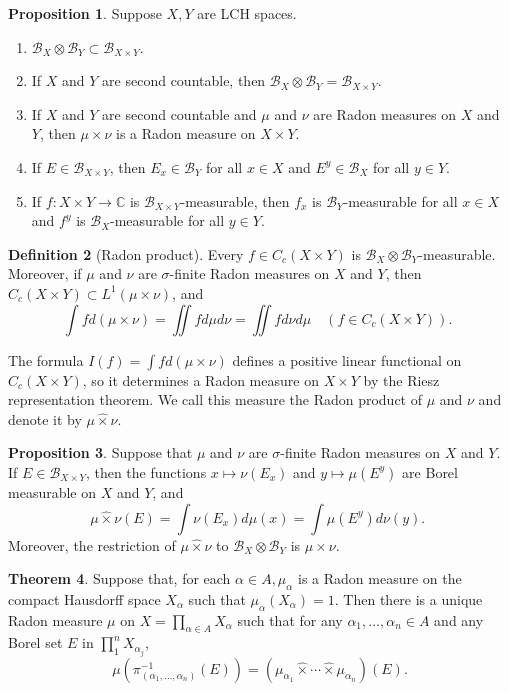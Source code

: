 \documentclass[12pt,a4paper]{book}
\newenvironment{enu}{\begin{enumerate}[(1)]}{\end{enumerate}}
\theoremstyle{definition}
\newtheorem{defn}{Definition}[section]
\newtheorem{theo}[defn]{Theorem}
\newtheorem{prop}[defn]{Proposition}
\begin{document}
\begin{prop}
    Suppose $X,Y$ are LCH spaces.
    \begin{enu}
        \item $\mathcal{B}_X \otimes \mathcal{B}_Y \subset \mathcal{B}_{X \times Y}$.
        \item If $X$ and $Y$ are second countable, then $\mathcal{B}_X \otimes \mathcal{B}_Y=\mathcal{B}_{X \times Y}$.
        \item If $X$ and $Y$ are second countable and $\mu$ and $\nu$ are Radon measures on $X$ and $Y$, then $\mu \times \nu$ is a Radon measure on $X \times Y$.
        \item If $E \in \mathcal{B}_{X \times Y}$, then $E_x \in \mathcal{B}_Y$ for all $x \in X$ and $E^y \in \mathcal{B}_X$ for all $y \in Y$.
        \item If $f: X \times Y \rightarrow \mathbb{C}$ is $\mathcal{B}_{X \times Y}$-measurable, then $f_x$ is $\mathcal{B}_Y$-measurable for all $x \in X$ and $f^y$ is $\mathcal{B}_X$-measurable for all $y \in Y$.
    \end{enu}
\end{prop}
\begin{defn}[Radon product]
    Every $f \in C_c(X \times Y)$ is $\mathcal{B}_X \otimes \mathcal{B}_Y$-measurable. Moreover, if $\mu$ and $\nu$ are $\sigma$-finite Radon measures on $X$ and $Y$,
    then $C_c(X \times Y) \subset L^1(\mu \times \nu)$, and
    $$
        \int f d(\mu \times \nu)=\iint f d \mu d \nu=\iint f d \nu d \mu \quad\left(f \in C_c(X \times Y)\right) \text {. }
    $$

    The formula $I(f)=\int f d(\mu \times \nu)$ defines a positive linear functional on $C_c(X \times Y)$,
    so it determines a Radon measure on $X \times Y$ by the Riesz representation theorem. We call this measure the Radon product of $\mu$ and $\nu$ and denote it by $\mu \widehat{\times} \nu$.
\end{defn}
\begin{prop}
    Suppose that $\mu$ and $\nu$ are $\sigma$-finite Radon measures on $X$ and $Y$.
    If $E \in \mathcal{B}_{X \times Y}$, then the functions $x \mapsto \nu\left(E_x\right)$ and $y \mapsto \mu\left(E^y\right)$ are Borel measurable on $X$ and $Y$, and
    $$
        \mu \widehat{\times} \nu(E)=\int \nu\left(E_x\right) d \mu(x)=\int \mu\left(E^y\right) d \nu(y) \text {. }
    $$
    Moreover, the restriction of $\mu \hat{\times} \nu$ to $\mathcal{B}_X \otimes \mathcal{B}_Y$ is $\mu \times \nu$.
\end{prop}
\begin{theo}
    Suppose that, for each $\alpha \in A, \mu_\alpha$ is a Radon measure on the compact Hausdorff space $X_\alpha$ such that $\mu_\alpha\left(X_\alpha\right)=1$. Then there is a unique Radon measure $\mu$ on $X=\prod_{\alpha \in A} X_\alpha$ such that for any $\alpha_1, \ldots, \alpha_n \in A$ and any Borel set $E$ in $\prod_1^n X_{\alpha_j}$,
    $$
        \mu\left(\pi_{\left(\alpha_1, \ldots, \alpha_n\right)}^{-1}(E)\right)=\left(\mu_{\alpha_1} \widehat{\times} \cdots \widehat{\times} \mu_{\alpha_n}\right)(E) .
    $$
    \label{theorem: infinite Radon product}
\end{theo}
\end{document}
